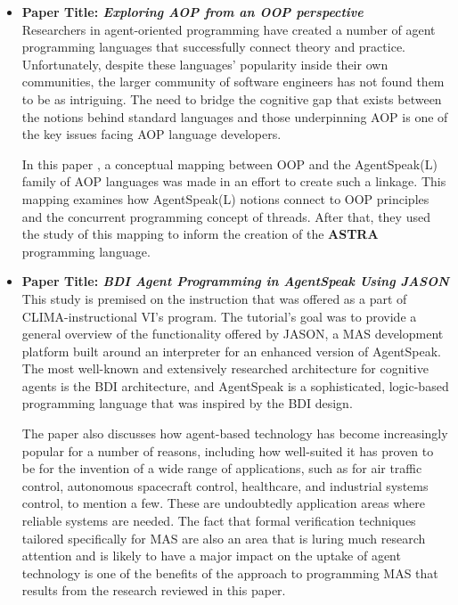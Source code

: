 \begin{itemize}[label={}]
\item \textbf{Paper Title: \textit{Exploring \ac{AOP} from an \ac{OOP} perspective}}\\

Researchers in agent-oriented programming have created a number of agent programming languages that successfully connect theory and practice. Unfortunately, despite these languages' popularity inside their own communities, the larger community of software engineers has not found them to be as intriguing. The need to bridge the cognitive gap that exists between the notions behind standard languages and those underpinning \ac{AOP} is one of the key issues facing \ac{AOP} language developers. 
 
 \vspace{.5cm}
 
In this paper \cite{astra}, a conceptual mapping between \ac{OOP} and the AgentSpeak(L) family of \ac{AOP} languages was made in an effort to create such a linkage. This mapping examines how AgentSpeak(L) notions connect to \ac{OOP} principles and the concurrent programming concept of threads. After that, they used the study of this mapping to inform the creation of the \textbf{ASTRA} programming language.

 \vspace{.5cm}
 
\item \textbf{Paper Title: \textit{\ac{BDI} Agent Programming in AgentSpeak Using JASON}} \\

This study \cite{jasonBDI} is premised on the instruction that was offered as a part of CLIMA-instructional VI's program. The tutorial's goal was to provide a general overview of the functionality offered by JASON, a \ac{MAS} development platform built around an interpreter for an enhanced version of AgentSpeak. The most well-known and extensively researched architecture for cognitive agents is the \ac{BDI} architecture, and AgentSpeak is a sophisticated, logic-based programming language that was inspired by the \ac{BDI} design.

\vspace{.5cm}

The paper also discusses how agent-based technology has become increasingly popular for a number of reasons, including how well-suited it has proven to be for the invention of a wide range of applications, such as for air traffic control, autonomous spacecraft control, healthcare, and industrial systems control, to mention a few. These are undoubtedly application areas where reliable systems are needed. The fact that formal verification techniques tailored specifically for \ac{MAS} are also an area that is luring much research attention and is likely to have a major impact on the uptake of agent technology is one of the benefits of the approach to programming \ac{MAS} that results from the research reviewed in this paper.


\end{itemize}
